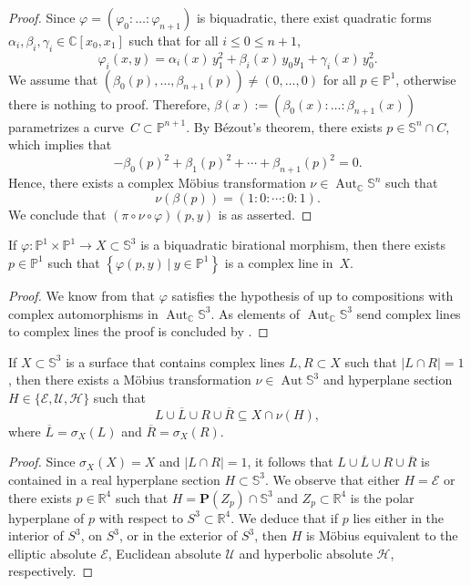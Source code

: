 \documentclass[11pt]{article}
\newcommand{\C}{\mathbb{C}}
\newcommand{\R}{\mathbb{R}}
\renewcommand{\P}{\mathbb{P}}
\renewcommand{\S}{\mathbb{S}}
\newcommand{\bP}{\mathbf{P}}
\newcommand{\cE}{\mathcal{E}}
\newcommand{\cU}{\mathcal{U}}
\newcommand{\cH}{\mathcal{H}}
\newcommand{\oL}{{\overline{L}}}
\newcommand{\oR}{{\overline{R}}}
\renewcommand{\c}{\colon}
\newcommand{\aut}{\operatorname{Aut}}
\newcommand{\set}[2]{\left\{#1 ~|~ #2\right\}}
\newcommand{\resp}{respectively}
\newcommand{\st}{such that }
\begin{document}
\begin{proof}
Since $\varphi=(\varphi_0:\ldots:\varphi_{n+1})$ is biquadratic,
there exist quadratic forms $\alpha_i,\beta_i,\gamma_i\in \C[x_0,x_1]$ \st
for all $i\leq 0\leq n+1$,
\[
\varphi_i(x,y)=\alpha_i(x)\,y_1^2+\beta_i(x)\,y_0y_1 + \gamma_i(x)\,y_0^2.
\]
We assume that $(\beta_0(p),\ldots,\beta_{n+1}(p))\neq (0,\ldots,0)$ for all $p\in\P^1$,
otherwise there is nothing to proof.
Therefore,
$\beta(x):=(\beta_0(x):\ldots:\beta_{n+1}(x))$ parametrizes a curve~$C\subset \P^{n+1}$.
By B\'ezout's theorem, there exists $p\in\S^n\cap C$, which implies that
\[
-\beta_0(p)^2+\beta_1(p)^2+\cdots+\beta_{n+1}(p)^2=0.
\]
Hence, there exists a complex M\"obius transformation $\nu\in\aut_\C\S^n$
\st
\[
\nu(\beta(p))=(1:0:\cdots:0:1).
\]
We conclude that $(\pi\circ\nu\circ \varphi)(p,y)$ is as asserted.
\end{proof}


\begin{lemma}
\label{lem:line}
If $\varphi\c\P^1\times\P^1\to X\subset \S^3$ is a biquadratic birational morphism,
then there exists $p\in\P^1$ such that $\set{\varphi(p,y)}{y\in\P^1}$ is
a complex line in~$X$.
\end{lemma}

\begin{proof}
We know from  that $\varphi$ satisfies the hypothesis
of  up to compositions with complex automorphisms in $\aut_\C\S^3$.
As elements of $\aut_\C\S^3$ send complex lines to complex lines
the proof is concluded by .
\end{proof}


\begin{lemma}
\label{lem:S3}
If $X\subset\S^3$ is a surface that contains complex lines $L,R\subset X$
\st $|L\cap R|=1$, then
there exists a M\"obius transformation $\nu\in\aut\S^3$ and
hyperplane section $H\in\{\cE,\cU,\cH\}$
\st
\[
L\cup\oL\cup R\cup\oR\subseteq X\cap \nu(H),
\]
where $\oL=\sigma_X(L)$ and $\oR=\sigma_X(R)$.
\end{lemma}

\begin{proof}
Since $\sigma_X(X)=X$ and $|L\cap R|=1$,
it follows that
$L\cup\oL\cup R\cup\oR$
is contained in a real hyperplane section $H\subset \S^3$.
We observe that either $H=\cE$ or there exists $p\in\R^4$ \st
$H=\bP(Z_p)\cap\S^3$ and $Z_p\subset \R^4$ is the polar hyperplane
of $p$ with respect to $S^3\subset\R^4$.
We deduce that if $p$ lies either
in the interior of $S^3$, on $S^3$, or in the exterior of $S^3$,
then $H$ is M\"obius equivalent to the elliptic absolute $\cE$,
Euclidean absolute $\cU$ and hyperbolic absolute $\cH$, \resp.
\end{proof}
\end{document}
